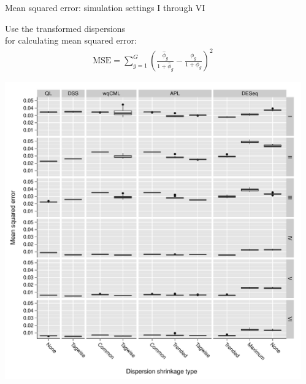 \documentclass{beamer}
\begin{document}
\begin{frame}
\begin{columns}[t]
\begin{column}{.33\linewidth}
\end{column}
\begin{column}{.33\linewidth}





\begin{block}{Mean squared error: simulation settings I through VI}
\begin{center}

\begin{minipage}[l]{0.49\linewidth} \centering
Use the transformed dispersions \\
for calculating mean squared error: \\ 
\begin{align*}
\text{MSE} =  \sum_{g = 1}^G \left (\frac{\widehat{\phi}_g}{1 + \widehat{\phi}_g} - \frac{\phi_g}{1 + \phi_g} \right )^2
\end{align*}
\end{minipage}
\begin{minipage}[r]{0.5\linewidth}
\includegraphics{../fig/mse_slides.pdf}
\end{minipage}

\end{center}
\end{block}


\end{column}
\end{columns}
\end{frame}
\end{document}
